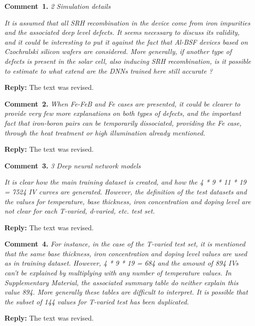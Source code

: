 \documentclass[num-refs]{wiley-article} %
\begin{document}
\textcolor[rgb]{0.00,0.50,1.00}{\textbf{Comment~1.}}
\emph{2 Simulation details}

\emph{It is assumed that all SRH recombination in the device come from iron impurities and the associated deep level defects. 
It seems necessary to discuss its validity, and it could be interesting to put it against the fact that Al-BSF devices based on Czochralski silicon wafers are considered. 
More generally, if another type of defects is present in the solar cell, also inducing SRH recombination, 
is it possible to estimate to what extend are the DNNs trained here still accurate ? }

\noindent
\textcolor[rgb]{0.51,0.00,0.00}{\textbf{Reply:}}
The text was revised.

\textcolor[rgb]{0.00,0.50,1.00}{\textbf{Comment~2.}}
\emph{When Fe-FeB and Fe cases are presented, it could be clearer to provide very few more explanations on both types of defects, 
and the important fact that iron-boron pairs can be temporarily dissociated, providing the Fe case, 
through the heat treatment or high illumination already mentioned. }

\noindent
\textcolor[rgb]{0.51,0.00,0.00}{\textbf{Reply:}}
The text was revised.



\textcolor[rgb]{0.00,0.50,1.00}{\textbf{Comment~3.}}
\emph{3 Deep neural network models}

\emph{
It is clear how the main training dataset is created, and how the 4 * 9 * 11 * 19 = 7524 IV curves are generated. 
However, the definition of the test datasets and the values for temperature, 
base thickness, iron concentration and doping level are not clear for each T-varied, d-varied, etc. test set. }

\noindent
\textcolor[rgb]{0.51,0.00,0.00}{\textbf{Reply:}}
The text was revised.


\textcolor[rgb]{0.00,0.50,1.00}{\textbf{Comment~4.}}
\emph{
For instance, in the case of the T-varied test set, it is mentioned that the same base thickness, 
iron concentration and doping level values are used as in training dataset. 
However, 4 * 9 * 19 = 684 and the amount of 894 IVs can’t be explained by multiplying with any number of temperature values. 
In Supplementary Material, the associated summary table do neither explain this value 894. More generally these tables are difficult to interpret. It is possible that the subset of 144 values for T-varied test has been duplicated. }

\noindent
\textcolor[rgb]{0.51,0.00,0.00}{\textbf{Reply:}}
The text was revised.
\end{document}
